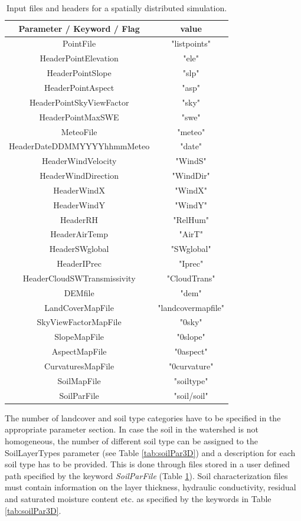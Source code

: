 \begin{table}[h!]
\begin{center}
\begin{tabular}[c]{|c|c|}
\hline
Parameter / Keyword / Flag & value\\
\hline
PointFile& "listpoints" \\
HeaderPointElevation  & "ele" \\
HeaderPointSlope & "slp"\\
HeaderPointAspect  & "asp"\\
HeaderPointSkyViewFactor & "sky"\\
HeaderPointMaxSWE & "swe"\\
\hline
MeteoFile & "meteo"\\
HeaderDateDDMMYYYYhhmmMeteo & "date" \\
HeaderWindVelocity & "WindS" \\
HeaderWindDirection & "WindDir" \\
HeaderWindX & "WindX"\\
HeaderWindY &"WindY"  \\
HeaderRH & "RelHum"\\
HeaderAirTemp & "AirT" \\
HeaderSWglobal & "SWglobal"\\
HeaderIPrec & "Iprec" \\
HeaderCloudSWTransmissivity & "CloudTrans" \\
\hline
DEMfile & "dem"\\
LandCoverMapFile & "landcovermapfile" \\
SkyViewFactorMapFile & "0sky"\\
SlopeMapFile & "0slope" \\
AspectMapFile & "0aspect" \\
CurvaturesMapFile & "0curvature" \\
SoilMapFile & "soiltype" \\
SoilParFile & "soil/soil" \\
\hline
\end{tabular}
\caption{Input files and headers for a spatially distributed simulation.}
\label{tab:inputHeader3D}
\end{center}
\end{table}

The number of landcover and soil type categories have to be specified in the appropriate parameter section. 
In case the soil in the watershed is not homogeneous, the number of different soil type can be assigned to the SoilLayerTypes parameter (see Table \ref{tab:soilPar3D}) and a description for each soil type has to be provided. This is done through files stored in a user defined path specified by the keyword {\it SoilParFile} (Table \ref{tab:inputHeader3D}). Soil characterization files must contain information on the layer thickness, hydraulic conductivity, residual and saturated moisture content etc. as specified by the keywords in Table \ref{tab:soilPar3D}. 

